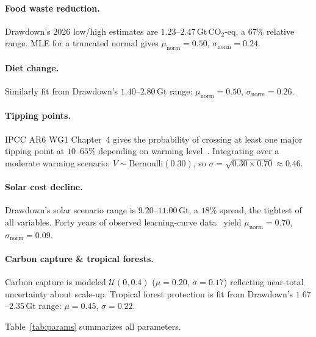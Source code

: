 \documentclass[10pt,twocolumn]{article}
\begin{document}
\paragraph{Food waste reduction.}
Drawdown's 2026 low/high estimates are $1.23$--$2.47$\,Gt\,CO$_2$-eq,
a $67\%$ relative range.  MLE for a truncated normal gives
$\mu_{\text{norm}}=0.50$, $\sigma_{\text{norm}}=0.24$.

\paragraph{Diet change.}
Similarly fit from Drawdown's $1.40$--$2.80$\,Gt range:
$\mu_{\text{norm}}=0.50$, $\sigma_{\text{norm}}=0.26$.

\paragraph{Tipping points.}
IPCC AR6 WG1 Chapter~4 gives the probability of crossing at least one
major tipping point at $10$--$65\%$ depending on warming level~\cite{ipcc_ar6}.
Integrating over a moderate warming scenario: $V \sim \text{Bernoulli}(0.30)$,
so $\sigma = \sqrt{0.30 \times 0.70} \approx 0.46$.

\paragraph{Solar cost decline.}
Drawdown's solar scenario range is $9.20$--$11.00$\,Gt, a $18\%$ spread,
the tightest of all variables.  Forty years of observed learning-curve
data~\cite{owid_energy} yield $\mu_{\text{norm}}=0.70$,
$\sigma_{\text{norm}}=0.09$.

\paragraph{Carbon capture \& tropical forests.}
Carbon capture is modeled $\mathcal{U}(0,0.4)$ ($\mu=0.20$, $\sigma=0.17$)
reflecting near-total uncertainty about scale-up.  Tropical forest
protection is fit from Drawdown's $1.67$--$2.35$\,Gt range:
$\mu=0.45$, $\sigma=0.22$.

Table~\ref{tab:params} summarizes all parameters.
\end{document}
